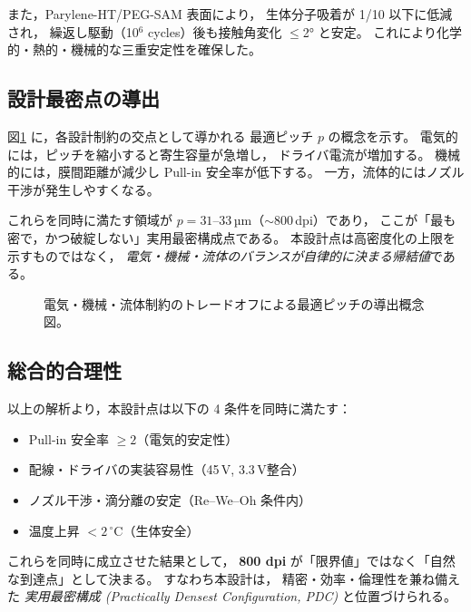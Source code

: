 また，Parylene-HT/PEG-SAM 表面により，
生体分子吸着が 1/10 以下に低減され，
繰返し駆動（10$^6$ cycles）後も接触角変化 $\le$2° と安定。
これにより化学的・熱的・機械的な三重安定性を確保した。

\subsection{設計最密点の導出}
図\ref{fig:tradeoff} に，各設計制約の交点として導かれる
最適ピッチ $p$ の概念を示す。
電気的には，ピッチを縮小すると寄生容量が急増し，
ドライバ電流が増加する。
機械的には，膜間距離が減少し Pull-in 安全率が低下する。
一方，流体的にはノズル干渉が発生しやすくなる。

これらを同時に満たす領域が $p=31$--33\,µm（$\sim$800\,dpi）であり，
ここが「最も密で，かつ破綻しない」実用最密構成点である。
本設計点は高密度化の上限を示すものではなく，
\emph{電気・機械・流体のバランスが自律的に決まる帰結値}である。

\begin{figure}[t]
\centering
{}
\caption{電気・機械・流体制約のトレードオフによる最適ピッチの導出概念図。}
\label{fig:tradeoff}
\end{figure}

\subsection{総合的合理性}
以上の解析より，本設計点は以下の 4 条件を同時に満たす：
\begin{itemize}[leftmargin=6mm]
\item Pull-in 安全率 $\ge2$（電気的安定性）
\item 配線・ドライバの実装容易性（45\,V, 3.3\,V整合）
\item ノズル干渉・滴分離の安定（Re–We–Oh 条件内）
\item 温度上昇 $<2\,^\circ$C（生体安全）
\end{itemize}
これらを同時に成立させた結果として，
\textbf{800 dpi} が「限界値」ではなく「自然な到達点」として決まる。
すなわち本設計は，
精密・効率・倫理性を兼ね備えた
\emph{実用最密構成 (Practically Densest Configuration, PDC)} と位置づけられる。
